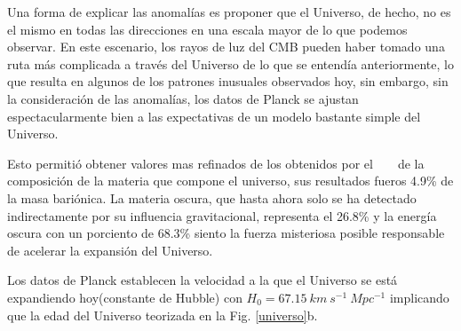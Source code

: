 Una forma de explicar las anomalías es proponer que el Universo, de hecho, no es el mismo en todas las direcciones en una escala mayor de lo que podemos observar. En este escenario, los rayos de luz del CMB pueden haber tomado una ruta más complicada a través del Universo de lo que se entendía anteriormente, lo que resulta en algunos de los patrones inusuales observados hoy, sin embargo, sin la consideración de las anomalías, los datos de Planck se ajustan espectacularmente bien a las expectativas de un modelo bastante simple del Universo.

Esto permitió obtener valores mas refinados de los obtenidos por el ~ \WMAP ~ de la composición de la materia que compone el universo, sus resultados fueros 4.9\% de la masa bariónica. La materia oscura, que hasta ahora solo se ha detectado indirectamente por su influencia gravitacional, representa el 26.8\% y la energía oscura con un porciento de 68.3\% siento la fuerza misteriosa posible responsable de acelerar la expansión del Universo.

Los datos de Planck establecen la velocidad a la que el Universo se está expandiendo hoy(constante de Hubble) con $H_0 = 67.15~km~s^{-1} ~Mpc^{-1}$ implicando que la edad del Universo teorizada en la Fig. \ref{universo}b. 










